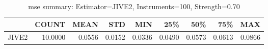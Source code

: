 \begin{table}[ht]
\centering
\caption{mse summary: Estimator=JIVE2, Instruments=100, Strength=0.70}
\begin{tabular}{lrrrrrrrr}
\toprule
 & COUNT & MEAN & STD & MIN & 25\% & 50\% & 75\% & MAX \\
\midrule
JIVE2 & 10.0000 & 0.0556 & 0.0152 & 0.0336 & 0.0490 & 0.0573 & 0.0613 & 0.0866 \\
\bottomrule
\end{tabular}
\end{table}
